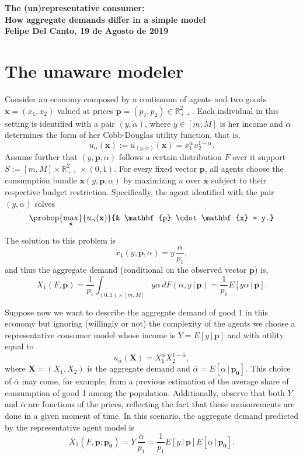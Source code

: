 \documentclass[english, a4paper,12pt]{article}
\begin{document}
\begin{center} \bf \large
	The (un)representative consumer: \\ How aggregate demands differ in a simple model \\ Felipe Del Canto, 19 de Agosto de 2019
\end{center}

\section{The unaware modeler}
Consider an economy composed by a continuum of agents and two goods $\mathbf{x} = (x_{1}, x_{2})$ valued at prices $\mathbf{p} = (p_{1}, p_{2}) \in \mathbb{R}^{2}_{++}$. Each individual in this setting is identified with a pair $(y,\alpha)$, where $y \in [m,M]$ is her income and $\alpha$ determines the form of her Cobb-Douglas utility function, that is,
	$$u_{\alpha}(\mathbf{x}) := u_{(y,\alpha)}(\mathbf{x}) = x_{1}^{\alpha}x_{2}^{1-\alpha}.$$
Assume further that $(y,\mathbf{p},\alpha)$ follows a certain distribution $F$ over it support $S := [m,M] \times \mathbb{R}^{2}_{++} \times (0,1)$. For every fixed vector $\mathbf{p}$, all agents choose the consumption bundle $\mathbf{x}(y,\mathbf{p},\alpha)$ by maximizing $u$ over $\mathbf{x}$ subject to their respective budget restriction. Specifically, the agent identified with the pair $(y,\alpha)$ solves
	$$\probop{\max_{\mathbf{x}}}{u_{\alpha}(\mathbf{x})}
							{&	\mathbf{p} \cdot \mathbf{x} = y.}$$ 

The solution to this problem is
	$$x_{1}(y, \mathbf{p}, \alpha) = y\, \frac{\alpha}{p_{1}},$$
and thus the aggregate demand (conditional on the observed vector $\mathbf{p}$) is,
	$$X_{1}(F, \mathbf{p}) = \frac{1}{p_{1}}\int_{(0,1) \times [m,M]} y \alpha \, dF(\alpha ,y \, | \, \mathbf{p}) 
		= \frac{1}{p_{1}}E[y\alpha \, | \, \mathbf{p}].$$

Suppose now we want to describe the aggregate demand of good 1 in this economy but ignoring (willingly or not) the complexity of the agents we choose a representative consumer model whose income is $Y = E[y \, | \, \mathbf{p}]$ and with utility equal to
	$$u_{\overline{\alpha}}(\mathbf{X}) = X_{1}^{\overline{\alpha}}X_{2}^{1-\overline{\alpha}},$$
where $\mathbf{X} = (X_{1}, X_{2})$ is the aggregate demand and $\overline{\alpha} = E[\alpha \,| \, \mathbf{p_{0}}]$. This choice of $\overline{\alpha}$ may come, for example, from a previous estimation of the average share of consumption of good 1 among the population. Additionally, observe that both $Y$ and $\overline{\alpha}$ are functions of the prices, reflecting the fact that these measurements are done in a given moment of time. In this scenario, the aggregate demand predicted by the representative agent model is
	$$\overline{X}_{1}(F, \mathbf{p} ; \mathbf{p_{0}})
		=	Y \, \frac{\overline{\alpha}}{p_{1}}
		=	\frac{1}{p_{1}}E[y \, | \, \mathbf{p}] E[\alpha \,| \, \mathbf{p_{0}}].
	$$
\end{document}
